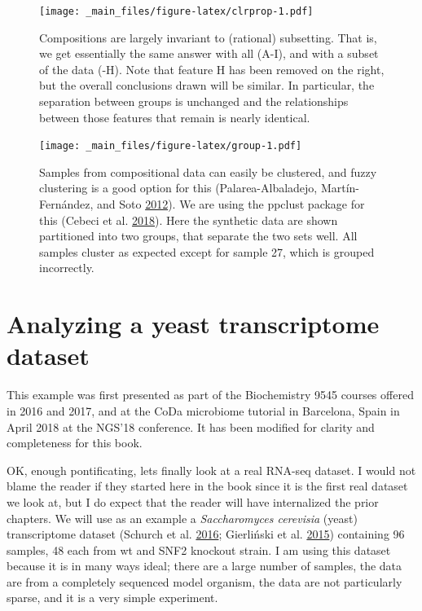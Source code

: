\documentclass[onecolumn]{book}
\theoremstyle{definition}
\theoremstyle{definition}
\theoremstyle{definition}
\theoremstyle{remark}
\begin{document}
\begin{figure}
\centering
\texttt{[image: \_main\_files/figure-latex/clrprop-1.pdf]}
\caption{\label{fig:clrprop}Compositions are largely invariant to (rational)
subsetting. That is, we get essentially the same answer with all (A-I),
and with a subset of the data (-H). Note that feature H has been removed
on the right, but the overall conclusions drawn will be similar. In
particular, the separation between groups is unchanged and the
relationships between those features that remain is nearly identical.}
\end{figure}

\begin{figure}
\centering
\texttt{[image: \_main\_files/figure-latex/group-1.pdf]}
\caption{\label{fig:group}Samples from compositional data can easily be
clustered, and fuzzy clustering is a good option for this
(Palarea-Albaladejo, Martín-Fernández, and Soto
\protect\hyperlink{ref-fernandez:2012}{2012}). We are using the ppclust
package for this (Cebeci et al.
\protect\hyperlink{ref-fuzzy:2018}{2018}). Here the synthetic data are
shown partitioned into two groups, that separate the two sets well. All
samples cluster as expected except for sample 27, which is grouped
incorrectly.}
\end{figure}

\hypertarget{analyzing-a-yeast-transcriptome-dataset}{%
\chapter{Analyzing a yeast transcriptome
dataset}\label{analyzing-a-yeast-transcriptome-dataset}}

\hspace{2cm}\begin{minipage}[ct]{10cm}
\parskip=5pt
\parindent=5pt
This example was first presented as part of the Biochemistry 9545 courses offered in 2016 and 2017, and at the CoDa microbiome tutorial in Barcelona, Spain in April 2018 at the NGS'18 conference.  It has been modified for clarity and completeness for this book.
\end{minipage}
\vspace{1cm}

OK, enough pontificating, lets finally look at a real RNA-seq dataset. I
would not blame the reader if they started here in the book since it is
the first real dataset we look at, but I do expect that the reader will
have internalized the prior chapters. We will use as an example a
\emph{Saccharomyces cerevisia} (yeast) transcriptome dataset (Schurch et
al. \protect\hyperlink{ref-Schurch:2016aa}{2016}; Gierliński et al.
\protect\hyperlink{ref-Gierlinski:2015aa}{2015}) containing 96 samples,
48 each from wt and SNF2 knockout strain. I am using this dataset
because it is in many ways ideal; there are a large number of samples,
the data are from a completely sequenced model organism, the data are
not particularly sparse, and it is a very simple experiment.
\end{document}
